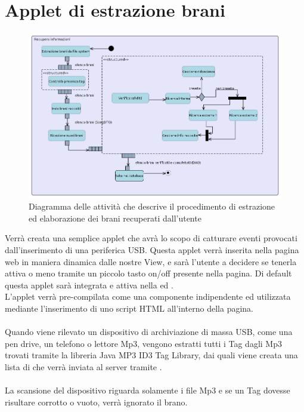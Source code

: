 \section{Applet di estrazione brani}
\begin{figure}[h]
  \centering
  \includegraphics[width=16.5cm]{img/ST/recupero.png}
\caption{Diagramma delle attivit\`a che descrive il procedimento di estrazione
ed elaborazione dei brani recuperati dall'utente}
\end{figure}
Verr\`a creata una semplice applet che avr\`a lo scopo di catturare eventi
provocati dall'inserimento di una periferica USB. Questa applet verr\`a inserita
nella pagina web in maniera dinamica dalle nostre View, e sar\`a l'utente a
decidere se tenerla attiva o meno tramite un piccolo tasto on/off presente nella
pagina. Di default questa applet sar\`a integrata e attiva nella
 ed .\\
L'applet verr\`a pre-compilata come una componente indipendente ed utilizzata
mediante l'inserimento di uno script HTML all'interno della pagina.\\
\\
Quando viene rilevato un dispositivo di archiviazione di massa USB, come una
pen drive, un telefono o lettore Mp3, vengono estratti tutti i Tag dagli Mp3
trovati tramite la libreria Java MP3 ID3 Tag Library, dai quali viene creata una
lista di  che verr\`a inviata al server tramite .\\
\\
La scansione del dispositivo riguarda solamente i file Mp3 e se un Tag dovesse
risultare corrotto o vuoto, verr\`a ignorato il brano.\\
\\
